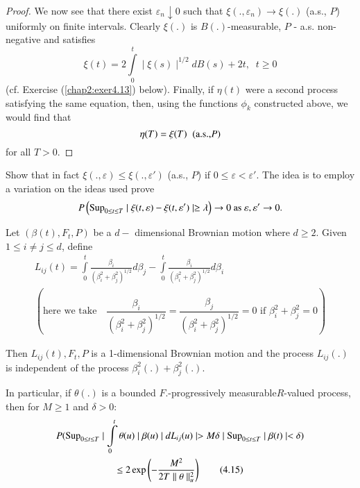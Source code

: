 \begin{proof}
We now see that there exist $ \varepsilon_n \downarrow 0 $ such that $
\xi (., \varepsilon_n ) \rightarrow \xi (.)$ (a.s., $P$) uniformly
on finite intervals. Clearly $ \xi (.) $ is  $ B (.) $-measurable, $
P$ - a.s. non-negative and satisfies 
$$
\xi (t) = 2 \int \limits^{t}_{0} \mid \xi (s) \mid^{1/2} dB (s)  +
2t,  \;\; t \ge 0  
$$
(cf. Exercise (\ref{chap2:exer4.13}) below). Finally, if $\eta (t) $
were a second process satisfying the  same equation, then, using the
functions $\phi_k$  constructed above, we would find that  
$$
\eta ( T ) =  \xi ( T )  \;\; ({\rm a.s., } P)
$$
for all  $T > 0 $.
 \end{proof}

\setcounter{exercise}{12}
\begin{exercise}\label{chap2:exer4.13}%
 Show that in fact $ \xi ( ., \varepsilon) \leq  \xi (.,
 \varepsilon')$ (a.s., $P$) if $ 0 \leq 
 \varepsilon < \varepsilon' $. The idea is to  employ a variation on
 the ideas  used prove  
 $$
 P \left( \operatorname{Sup}_{0 \leq t \leq T}  \mid \xi (t,\varepsilon) - \xi
 (t,\varepsilon') \mid \ge \lambda \right) \rightarrow 0 \text{ as }
 \varepsilon,\varepsilon' \rightarrow 0. 
 $$
\end{exercise}

\setcounter{lemma}{13}
\begin{lemma}\label{chap2:lem4.14}%
Let $ ( \beta (t), F_t, P ) $  be a $d-$ dimensional Brownian
motion where $ d \ge 2 $. Given $ 1 \leq i \neq   j \leq d $, define 
\begin{gather*}
L_{ij} (t)  = \int \limits^{t}_{0}  \frac{ \beta_i}{ ( \beta^2_i +
  \beta^2_j )^{1/2}} d \beta_j - \int \limits^{t}_{0}  \frac{
  \beta_i}{ ( \beta^2_i + \beta^2_j )^{1/2}} d \beta_i \\
\left(\text{here we take} \quad  \dfrac{ \beta_i}{ ( \beta^2_i +
    \beta^2_j )^{1/2}}  = 
\dfrac{ \beta_j}{ ( \beta^2_i + \beta^2_j )^{1/2}} = 0 \text{ if }
\beta^2_i + \beta^2_j = 0 \right)
\end{gather*}\pageoriginale

Then $ L_{i j} (t), F_t, P $ is a 1-dimensional Brownian motion and 
the  process $ L_{i j} ( . )$ is independent of the process $
\beta^2_i (.)  + \beta^2_j (.) $.  

In particular, if $ \theta (.) $ is a bounded  $F.$-progressively
measurable\break $R$-valued process, then for $ M \ge 1$ and  $ \delta > 0$:  
\begin{gather*}
P ( \operatorname{Sup}_{0 \leq t \leq T} \mid  \int \limits^{t}_{0} \theta (u) \mid
\beta (u) \mid d L_{ij} (u) \mid > M \delta \mid \operatorname{Sup}_{0 \leq t \leq
  T}  \mid  \beta (t) \mid < \delta ) \\
 \leq 2 \exp  \left( - \frac{M^2}{2 T
  \mid\mid \theta \mid\mid^2_u }\right) \tag{4.15}\label{chap2:eq4.15} 
\end{gather*}
\end{lemma}

